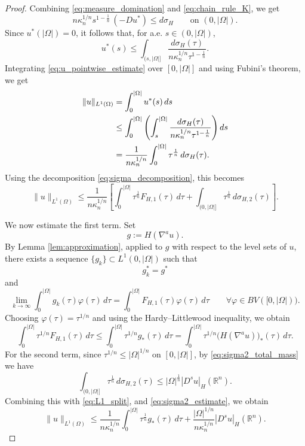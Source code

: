 \documentclass[oneside,a4paper,12pt,notitlepage]{article}
\theoremstyle{definition}
\begin{document}
\begin{proof}
Combining \eqref{eq:measure_domination} and \eqref{eq:chain_rule_K}, we get
\[
n\kappa_n^{1/n}s^{1-\frac1n}\,(-Du^*)
\le
d\sigma_H
\qquad\text{on }(0,|\Omega|).
\]
Since \(u^*(|\Omega|)=0\), it follows that, for a.e. \(s\in(0,|\Omega|)\),
\begin{equation}\label{eq:u_pointwise_estimate}
u^*(s)
\le
\int_{(s,|\Omega|]}
\frac{d\sigma_H(\tau)}
{n\kappa_n^{1/n}\tau^{1-\frac1n}}.
\end{equation}
Integrating \eqref{eq:u_pointwise_estimate} over $[0,|\Omega|]$ and using Fubini's
theorem, we get
\begin{align}
\|u\|_{L^1(\Omega)}
&=
\int_0^{|\Omega|} u^*(s)\,ds \notag\\
&\le
\int_0^{|\Omega|}
\left(
\int_s^{|\Omega|}
\frac{d\sigma_H(\tau)}{n\kappa_n^{1/n}\tau^{1-\frac1n}}
\right)ds \notag\\
&=
\frac1{n\kappa_n^{1/n}}
\int_0^{|\Omega|}\tau^{\frac1n}\,d\sigma_H(\tau). \label{eq:L1_after_fubini}
\end{align}
Using the decomposition \eqref{eq:sigma_decomposition}, this becomes
\begin{equation}\label{eq:L1_split}
\|u\|_{L^1(\Omega)}
\le
\frac1{n\kappa_n^{1/n}}
\left[
\int_0^{|\Omega|}\tau^{\frac1n}F_{H,1}(\tau)\,d\tau
+
\int_{(0,|\Omega|]}\tau^{\frac1n}\,d\sigma_{H,2}(\tau)
\right].
\end{equation}

We now estimate the first term. Set
\[
g:=H(\nabla^a u).
\]
By  Lemma \ref{lem:approximation}, applied to \(g\) with
respect to the level sets of \(u\), there exists a sequence \(\{g_k\}\subset L^1(0,|\Omega|)\)
such that
\[
g_k^*=g^*
\]
and
\[
\lim_{k\to\infty}
\int_0^{|\Omega|} g_k(\tau)\varphi(\tau)\,d\tau
=
\int_0^{|\Omega|}F_{H,1}(\tau)\varphi(\tau)\,d\tau
\qquad
\forall\varphi\in BV([0,|\Omega|)).
\]
Choosing \(\varphi(\tau)=\tau^{1/n}\) and using the Hardy--Littlewood inequality,
we obtain
\[
\int_0^{|\Omega|}\tau^{1/n}F_{H,1}(\tau)\,d\tau
\le
\int_0^{|\Omega|}\tau^{1/n}g_*(\tau)\,d\tau
=
\int_0^{|\Omega|}\tau^{1/n}\big(H(\nabla^a u)\big)_*(\tau)\,d\tau .
\]
For the second term, since $\tau^{1/n}\le |\Omega|^{1/n}$ on $[0,|\Omega|]$, by
\eqref{eq:sigma2_total_mass} we have
\begin{equation}\label{eq:sigma2_estimate}
\int_{(0,|\Omega|]}\tau^{\frac1n}\,d\sigma_{H,2}(\tau)
\le
|\Omega|^{\frac1n}|D^s u|_H(\mathbb{R}^n).
\end{equation}
Combining this with \eqref{eq:L1_split}, and \eqref{eq:sigma2_estimate},
we obtain
\begin{equation}\label{eq:L1_upper_bound}
\|u\|_{L^1(\Omega)}
\le
\frac1{n\kappa_n^{1/n}}
\int_0^{|\Omega|}\tau^{\frac1n} g_*(\tau)\,d\tau
+
\frac{|\Omega|^{1/n}}{n\kappa_n^{1/n}}|D^s u|_H(\mathbb{R}^n).
\end{equation}


\end{proof}
\end{document}
